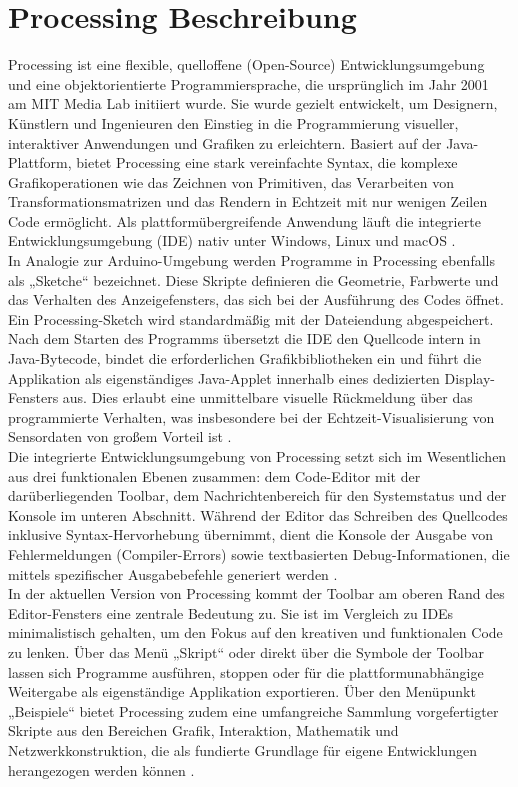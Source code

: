 \section{Processing Beschreibung}
\label{chap:Processing_Beschreibung}
Processing ist eine flexible, quelloffene (Open-Source) Entwicklungsumgebung und eine objektorientierte Programmiersprache, die ursprünglich im Jahr 2001 am MIT Media Lab initiiert wurde. Sie wurde gezielt entwickelt, um Designern, Künstlern und Ingenieuren den Einstieg in die Programmierung visueller, interaktiver Anwendungen und Grafiken zu erleichtern. Basiert auf der Java-Plattform, bietet Processing eine stark vereinfachte Syntax, die komplexe Grafikoperationen wie das Zeichnen von Primitiven, das Verarbeiten von Transformationsmatrizen und das Rendern in Echtzeit mit nur wenigen Zeilen Code ermöglicht. Als plattformübergreifende Anwendung läuft die integrierte Entwicklungsumgebung (IDE) nativ unter Windows, Linux und macOS \cite{Reas:2014}.
\\
In Analogie zur Arduino-Umgebung werden Programme in Processing ebenfalls als „Sketche“ bezeichnet. Diese Skripte definieren die Geometrie, Farbwerte und das Verhalten des Anzeigefensters, das sich bei der Ausführung des Codes öffnet. Ein Processing-Sketch wird standardmä\ss ig mit der Dateiendung  abgespeichert. Nach dem Starten des Programms übersetzt die IDE den Quellcode intern in Java-Bytecode, bindet die erforderlichen Grafikbibliotheken ein und führt die Applikation als eigenständiges Java-Applet innerhalb eines dedizierten Display-Fensters aus. Dies erlaubt eine unmittelbare visuelle Rückmeldung über das programmierte Verhalten, was insbesondere bei der Echtzeit-Visualisierung von Sensordaten von gro\ss em Vorteil ist \cite{Reas:2014}.
\\
Die integrierte Entwicklungsumgebung von Processing setzt sich im Wesentlichen aus drei funktionalen Ebenen zusammen: dem Code-Editor mit der darüberliegenden Toolbar, dem Nachrichtenbereich für den Systemstatus und der Konsole im unteren Abschnitt. Während der Editor das Schreiben des Quellcodes inklusive Syntax-Hervorhebung übernimmt, dient die Konsole der Ausgabe von Fehlermeldungen (Compiler-Errors) sowie textbasierten Debug-Informationen, die mittels spezifischer Ausgabebefehle generiert werden \cite{Reas:2014}.
\\
In der aktuellen Version von Processing kommt der Toolbar am oberen Rand des Editor-Fensters eine zentrale Bedeutung zu. Sie ist im Vergleich zu IDEs minimalistisch gehalten, um den Fokus auf den kreativen und funktionalen Code zu lenken. Über das Menü „Skript“ oder direkt über die Symbole der Toolbar lassen sich Programme ausführen, stoppen oder für die plattformunabhängige Weitergabe als eigenständige Applikation exportieren. Über den Menüpunkt „Beispiele“ bietet Processing zudem eine umfangreiche Sammlung vorgefertigter Skripte aus den Bereichen Grafik, Interaktion, Mathematik und Netzwerkkonstruktion, die als fundierte Grundlage für eigene Entwicklungen herangezogen werden können \cite{Reas:2014}.
